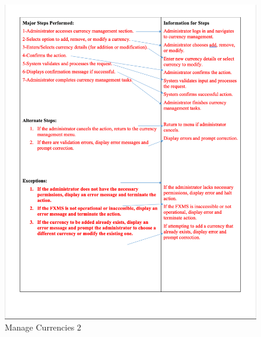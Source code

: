 \documentclass[a4paper]{report}
\begin{document}
\begin{figure}[h!]
    \centering
    \includegraphics[width=\textwidth]{images/uc/8.2-manage-currencies.png}
    \caption{Manage Currencies 2}
    \label{fig:8.2-manage-currencies}
\end{figure}
\end{document}
